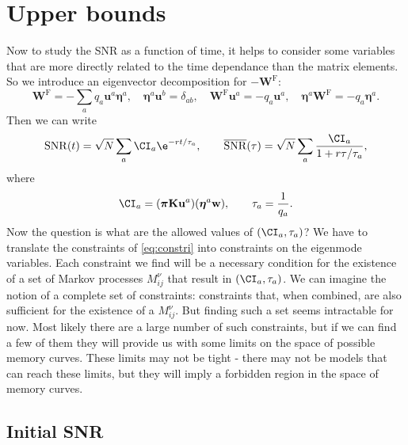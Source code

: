 \documentclass[12pt]{article}
\newcommand{\eqm}{\pi}
\newcommand{\eq}{\boldsymbol{\eqm}}
\newcommand{\wm}{w}
\newcommand{\w}{\mathbf{\wm}}
\newcommand{\Wm}{W}
\newcommand{\W}{\mathbf{\Wm}}
\newcommand{\MMdm}{M}
\newcommand{\encm}{K}
\newcommand{\enc}{\mathbf{\encm}}
\newcommand{\frg}{\W^{\mathrm{F}}}
\newcommand{\evrm}{u}
\newcommand{\evr}{\mathbf{\evrm}}
\newcommand{\evlm}{\eta}
\newcommand{\evl}{\boldsymbol{\evlm}}
\DeclareMathOperator{\snr}{SNR}
\newcommand{\snrb}{\overline{\snr}}
\begin{document}

\section{Upper bounds}\label{sec:upperbnds}

Now to study the SNR as a function of  time, it helps to consider some variables that are more directly related to the time dependance than the matrix elements. 
So we introduce an eigenvector decomposition for $-\frg$:
%
\begin{equation}\label{eq:eigendecomp}
  \frg = - \sum_a q_a \evr^a \evl^a,
  \quad
  \evl^a \evr^b = \delta_{ab},
  \quad
  \frg \evr^a = -q_a \evr^a,
  \quad
  \evl^a \frg = -q_a \evl^a.
\end{equation}
%
Then we can write
%
\begin{equation}\label{eq:snreig}
  \snr(t) = \sqrt{N}\sum_a \CI_a \e^{-rt/\tau_a},
  \qquad
  \snrb(\tau) = \sqrt{N}\sum_a \frac{\CI_a}{1+r\tau/\tau_a},
\end{equation}
%
where
%
\begin{equation}\label{eq:snrcoeffs}
  \CI_a = (\eq \enc \evr^a) (\evl^a \w),
  \qquad
  \tau_a = \frac{1}{q_a}.
\end{equation}
%
Now the question is what are the allowed values of \( (\CI_a, \tau_a) \)?
We have to translate the constraints of \cref{eq:constri} into constraints on the eigenmode variables.
Each constraint we find will be a necessary condition for the existence of a set of Markov processes \( \MMdm_{ij}^\nu \) that result in \( (\CI_a, \tau_a) \).
We can imagine the notion of a complete set of constraints: constraints that, when combined, are also sufficient for the existence of a \( \MMdm_{ij}^\nu \).
But finding such a set seems intractable for now.
Most likely there are a large number of such constraints, but if we can find a few of them they will provide us with some limits on the space of possible memory curves.
These limits may not be tight - there may not be models that can reach these limits, but they will imply a forbidden region in the space of memory curves.



\subsection{Initial SNR}\label{sec:initial}
\end{document}
